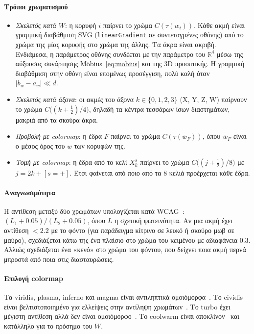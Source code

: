 \documentclass[10pt,a4paper]{article}
\theoremstyle{plain}
\theoremstyle{definition}
\newcommand{\R}{\mathbb{R}}
\newcommand{\code}[1]{\texttt{#1}}
\newcommand{\eng}[1]{\textenglish{#1}}
\begin{document}
\paragraph{Τρόποι χρωματισμού}
\begin{itemize}
\item \emph{Σκελετός κατά $W$}: η κορυφή $i$ παίρνει το χρώμα $C(\tau(w_i))$. Κάθε ακμή είναι γραμμική διαβάθμιση SVG (\code{linearGradient} σε συντεταγμένες οθόνης) από το χρώμα της μίας κορυφής στο χρώμα της άλλης. Τα άκρα είναι ακριβή. Ενδιάμεσα, η παράμετρος οθόνης συνδέεται με την παράμετρο του $\R^4$ μέσω της αύξουσας συνάρτησης \eng{Möbius}~\eqref{eq:mobius} και της 3D προοπτικής. Η γραμμική διαβάθμιση στην οθόνη είναι επομένως προσέγγιση, πολύ καλή όταν $|b_w-a_w|\ll d$.
\item \emph{Σκελετός κατά άξονα}: οι ακμές του άξονα $k\in\{0,1,2,3\}$ (X, Y, Z, W) παίρνουν το χρώμα $C\bigl((k+\tfrac12)/4\bigr)$, δηλαδή τα κέντρα τεσσάρων ίσων διαστημάτων, μακριά από τα σκούρα άκρα.
\item \emph{Προβολή με \eng{colormap}}: η έδρα $F$ παίρνει το χρώμα $C(\tau(\bar w_F))$, όπου $\bar w_F$ είναι ο μέσος όρος του $w$ των κορυφών της.
\item \emph{Τομή με \eng{colormap}}: η έδρα από το κελί $X_k^s$ παίρνει το χρώμα $C\bigl((j+\tfrac12)/8\bigr)$ με $j=2k+[s=+]$. Έτσι φαίνεται από ποιο από τα 8 κελιά προέρχεται κάθε έδρα.
\end{itemize}

\paragraph{Αναγνωσιμότητα} Η αντίθεση μεταξύ δύο χρωμάτων υπολογίζεται κατά \eng{WCAG}~\cite{wcag}: $(L_1+0.05)/(L_2+0.05)$, όπου $L$ η σχετική φωτεινότητα. Αν μια ακμή έχει αντίθεση $<2.2$ με το φόντο (για παράδειγμα κίτρινο σε λευκό ή σκούρο μωβ σε μαύρο), σχεδιάζεται κάτω της ένα πλαίσιο στο χρώμα του κειμένου με αδιαφάνεια $0.3$. Αλλιώς σχεδιάζεται ένα «κενό» στο χρώμα του φόντου, που δείχνει ποια ακμή περνά μπροστά από ποια στις διασταυρώσεις.

\paragraph{Επιλογή \eng{colormap}} Τα \eng{viridis}, \eng{plasma}, \eng{inferno} και \eng{magma} είναι αντιληπτικά ομοιόμορφα~\cite{viridis}. Το \eng{cividis} είναι βελτιστοποιημένο για ελλείψεις στην αντίληψη χρωμάτων~\cite{cividis}. Το \eng{turbo} έχει μέγιστη αντίθεση αλλά δεν είναι ομοιόμορφο~\cite{turbo}. Το \eng{coolwarm} είναι αποκλίνον~\cite{moreland} και κατάλληλο για το πρόσημο του $W$.
\end{document}
